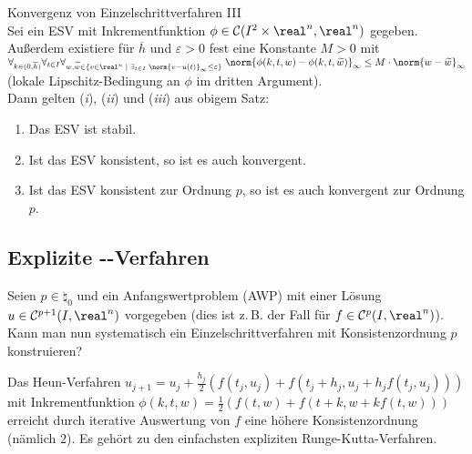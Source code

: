 \begin{Satz}{Konvergenz von Einzelschrittverfahren III}\\
    Sei ein ESV mit Inkrementfunktion
    $\phi \in \C(I^2 \times \real^n, \real^n)$ gegeben.
    Außerdem existiere für $\overline{h}$ und $\varepsilon > 0$ fest
    eine Konstante $M > 0$ mit\\
    $\forall_{k \in (0, \overline{h})}
    \forall_{t \in I} \forall_{w, \widetilde{w} \in
    \{v \in \real^n \;|\;
    \exists_{t \in I}\; \norm{v - u(t)}_\infty \le \varepsilon\}}\;
    \norm{\phi(k, t, w) - \phi(k, t, \widetilde{w})}_\infty \le
    M \cdot \norm{w - \widetilde{w}}_\infty$\\
    (lokale Lipschitz-Bedingung an $\phi$ im dritten Argument).\\
    Dann gelten (\emph{i}), (\emph{ii}) und (\emph{iii}) aus obigem Satz:
    \begin{enumerate}[label=(\emph{\roman*})]
        \item
        Das ESV ist stabil.

        \item
        Ist das ESV konsistent, so ist es auch konvergent.

        \item
        Ist das ESV konsistent zur Ordnung $p$, so ist es auch konvergent zur
        Ordnung $p$.
    \end{enumerate}
\end{Satz}

\pagebreak

\subsection{%
    Explizite --Verfahren%
}

\begin{Bem}
    Seien $p \in \natural_0$ und ein Anfangswertproblem (AWP) mit einer
    Lösung\\
    $u \in \C^{p+1}(I, \real^n)$ vorgegeben
    (dies ist z.\,B. der Fall für $f \in \C^p(I, \real^n)$).\\
    Kann man nun systematisch ein Einzelschrittverfahren mit
    Konsistenzordnung $p$ konstruieren?
\end{Bem}

\begin{Bsp}
    Das Heun-Verfahren $u_{j+1} = u_j + \frac{h_j}{2}
    (f(t_j, u_j) + f(t_j + h_j, u_j + h_j f(t_j, u_j)))$
    mit Inkrementfunktion
    $\phi(k, t, w) = \frac{1}{2} (f(t, w) + f(t + k, w + k f(t, w)))$
    erreicht durch iterative Auswertung von $f$ eine höhere Konsistenzordnung
    (nämlich $2$).
    Es gehört zu den einfachsten expliziten Runge-Kutta-Verfahren.
\end{Bsp}

